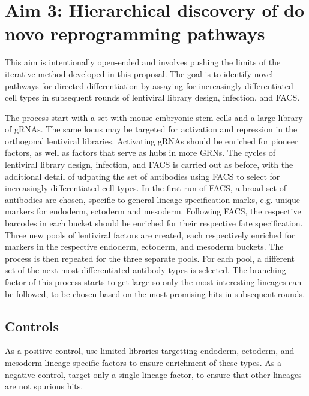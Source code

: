 \documentclass[10pt]{article}
\begin{document}


\section{Aim 3: Hierarchical discovery of do novo reprogramming pathways}

This aim is intentionally open-ended and involves pushing the limits of the iterative method developed in this proposal. The goal is to identify novel pathways for directed differentiation by assaying for increasingly differentiated cell types in subsequent rounds of lentiviral library design, infection, and FACS.

The process start with a set with mouse embryonic stem cells and a large library of gRNAs. The same locus may be targeted for activation and repression in the orthogonal lentiviral libraries. Activating gRNAs should be enriched for pioneer factors, as well as factors that serve as hubs in more GRNs. The cycles of lentiviral library design, infection, and FACS is carried out as before, with the additional detail of udpating the set of antibodies using FACS to select for increasingly differentiated cell types. In the first run of FACS, a broad set of antibodies are chosen, specific to general lineage specification marks, e.g. unique markers for endoderm, ectoderm and mesoderm. Following FACS, the respective barcodes in each bucket should be enriched for their respective fate specification. Three new pools of lentiviral factors are created, each respectively enriched for markers in the respective endoderm, ectoderm, and mesoderm buckets. The process is then repeated for the three separate pools. For each pool, a different set of the next-most differentiated antibody types is selected. The branching factor of this process starts to get large so only the most interesting lineages can be followed, to be chosen based on the most promising hits in subsequent rounds.

\subsection{Controls}

As a positive control, use limited libraries targetting endoderm, ectoderm, and mesoderm lineage-specific factors to ensure enrichment of these types. As a negative control, target only a single lineage factor, to ensure that other lineages are not spurious hits.
\end{document}
